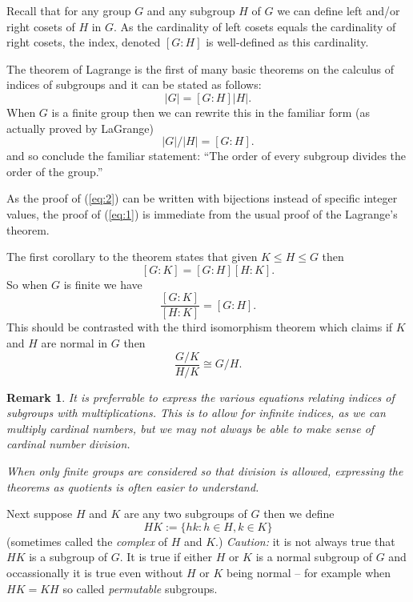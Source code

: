 \documentclass[12pt]{article}
\newtheorem{remark}[thm]{Remark}
\begin{document}
Recall that for any group $G$ and any subgroup $H$ of $G$ we can define left and/or right cosets of $H$ in $G$.  As the cardinality of left cosets equals the cardinality of right cosets, the index, denoted $[G:H]$ is well-defined as this cardinality.

The theorem of Lagrange is the first of many basic theorems on the calculus of indices of subgroups and it can be stated as follows:
\begin{equation}\label{eq:1}
    |G|=[G:H]|H|.
\end{equation}
When $G$ is a finite group then we can rewrite this in the familiar form (as actually proved by LaGrange) 
\begin{equation}\label{eq:2}
   |G|/|H|=[G:H].
\end{equation}
and so conclude the familiar statement: ``The order of every subgroup divides the order of the group.''

As the proof of (\ref{eq:2}) can be written with bijections instead of specific integer values, the proof of (\ref{eq:1}) is immediate from the usual proof of the Lagrange's theorem.

The first corollary to the theorem states that given $K\leq H\leq G$ then
\begin{equation}\label{eq:3a}
   [G:K]=[G:H][H:K].
\end{equation}
So when $G$ is finite we have
\begin{equation}\label{eq:3b}
   \frac{[G:K]}{[H:K]}=[G:H].
\end{equation}
This should be contrasted with the third isomorphism theorem which claims if $K$ and $H$ are normal in $G$ then
\begin{equation}
   \frac{G/K}{H/K}\cong G/H.
\end{equation}

\begin{remark}
It is preferrable to express the various equations relating indices of subgroups with multiplications.  This is to allow for infinite indices, as we can multiply cardinal numbers, but we may not always be able to make sense of cardinal number division.

When only finite groups are considered so that division is allowed, expressing the theorems as quotients is often easier to understand.
\end{remark}

Next suppose $H$ and $K$ are any two subgroups of $G$ then we define
  \[ HK:=\{ hk:h\in H, k\in K\}\]
(sometimes called the \emph{complex} of $H$ and $K$.)  \emph{Caution:} it is not always true that $HK$ is a subgroup of $G$.  It is true if either $H$ or $K$ is a normal subgroup of $G$ and occassionally it is true even without $H$ or $K$ being normal -- for example when $HK=KH$ so called \emph{permutable} subgroups.
\end{document}
